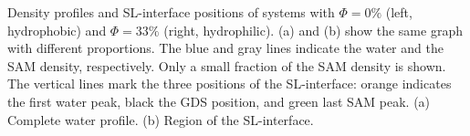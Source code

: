 \label{fig:SL-positions}Density profiles and SL-interface positions
of systems with $\Phi=0\%$ (left, hydrophobic) and $\Phi=33\%$ (right,
hydrophilic). (a) and (b) show the same graph with different proportions.
The blue and gray lines indicate the water and the SAM density, respectively.
Only a small fraction of the SAM density is shown. The vertical lines
mark the three positions of the SL-interface: orange indicates the
first water peak, black the GDS position, and green last SAM peak.
(a) Complete water profile. (b) Region of the SL-interface.